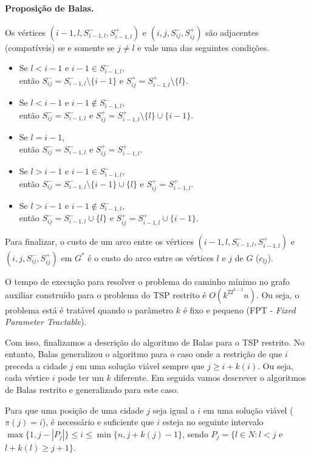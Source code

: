 \documentclass{article}
\begin{document}
\paragraph{Proposição de Balas.} Os vértices $(i-1, l, S^-_{i-1, l}, S^+_{i-1, l})$ e $(i, j, S^-_{ij}, S^+_{ij})$ são adjacentes (compatíveis) se e somente se $j \neq l$ e vale uma das seguintes condições.
\begin{itemize}
\item Se $l < i-1$ e $i-1 \in S^-_{i-1, l}$, \\então $S^-_{ij} = S^-_{i-1,l}\setminus\{i-1\}$ e $S^+_{ij} = S^+_{i-1,l} \setminus \{l\}$.
\item Se $l < i-1$ e $i-1 \notin S^-_{i-1, l}$, \\então $S^-_{ij} = S^-_{i-1,l}$ e $S^+_{ij} = S^+_{i-1,l} \setminus \{l\} \cup \{i-1\}$.
\item Se $l = i-1$, \\então $S^-_{ij} = S^-_{i-1,l}$ e $S^+_{ij} = S^+_{i-1,l}$.
\item Se $l > i-1$ e $i-1 \in S^-_{i-1, l}$, \\então $S^-_{ij} = S^-_{i-1,l}\setminus\{i-1\} \cup \{l\}$ e $S^+_{ij} = S^+_{i-1,l}$.
\item Se $l > i-1$ e $i-1 \notin S^-_{i-1, l}$, \\então $S^-_{ij} = S^-_{i-1,l} \cup \{l\}$ e $S^+_{ij} = S^+_{i-1,l} \cup \{i-1\}$.
  
\end{itemize}

Para finalizar, o custo de um arco entre os vértices $(i-1, l, S^-_{i-1, l}, S^+_{i-1, l})$ e $(i, j, S^-_{ij}, S^+_{ij})$ em $G^*$ é o custo do arco entre os vértices $l$ e $j$ de $G$ ($c_{lj}$).

O tempo de execução para resolver o problema do caminho mínimo no grafo auxiliar construído para o problema do TSP restrito é $O(k^22^{k-2}n)$. Ou seja, o problema está é tratável quando o parâmetro $k$ é fixo e pequeno (FPT - \textit{Fixed Parameter Tractable}).

Com isso, finalizamos a descrição do algoritmo de Balas para o TSP restrito. No entanto, Balas generalizou o algoritmo para o caso onde a restrição de que $i$ preceda a cidade $j$ em uma solução viável sempre que $j \geq i + k(i)$. Ou seja, cada vértice $i$ pode ter um $k$ diferente. Em seguida vamos descrever o algoritmos de Balas restrito e generalizado para este caso.

Para que uma posição de uma cidade $j$ seja igual a $i$ em uma solução viável ($\pi(j)=i$), é necessário e suficiente que $i$ esteja no seguinte intervalo $\max \{1, j - |P_j|\} \leq i \leq \min\{n, j + k(j) - 1\}$, sendo $P_j = \{l \in N: l < j$ e $l + k(l) \geq j + 1\}$.
\end{document}
